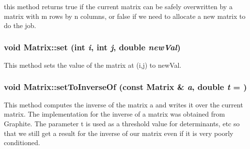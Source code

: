 this method returns true if the current matrix can be safely overwritten by a matrix with m rows by n columns, or false if we need to allocate a new matrix to do the job. \hypertarget{classCartWheel_1_1Math_1_1Matrix_aa33675ee32bcb342a7ed18f9e089b615}{
\subsubsection[{set}]{\setlength{\rightskip}{0pt plus 5cm}void Matrix::set (int {\em i}, \/  int {\em j}, \/  double {\em newVal})}}
\label{classCartWheel_1_1Math_1_1Matrix_aa33675ee32bcb342a7ed18f9e089b615}
This method sets the value of the matrix at (i,j) to newVal. \hypertarget{classCartWheel_1_1Math_1_1Matrix_aafef0fc884fdf893406fcbf9b69bdee5}{
\subsubsection[{setToInverseOf}]{\setlength{\rightskip}{0pt plus 5cm}void Matrix::setToInverseOf (const {\bf Matrix} \& {\em a}, \/  double {\em t} = {})}}
\label{classCartWheel_1_1Math_1_1Matrix_aafef0fc884fdf893406fcbf9b69bdee5}
This method computes the inverse of the matrix a and writes it over the current matrix. The implementation for the inverse of a matrix was obtained from Graphite. The parameter t is used as a threshold value for determinants, etc so that we still get a result for the inverse of our matrix even if it is very poorly conditioned.


